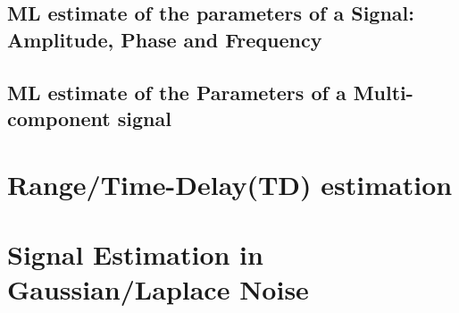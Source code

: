 \subsection{ML estimate of the parameters of a Signal: Amplitude, Phase and Frequency}
\subsection{ML estimate of the Parameters of a Multi-component signal}
\section{Range/Time-Delay(TD) estimation}
\section{Signal Estimation in Gaussian/Laplace Noise}


